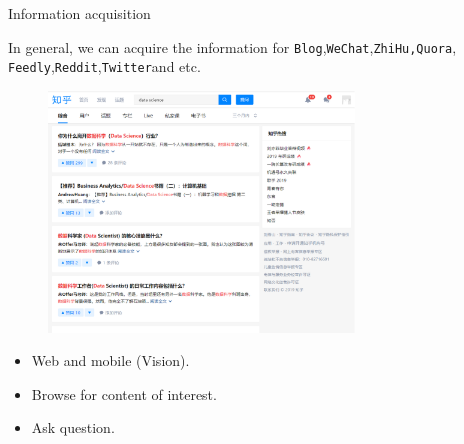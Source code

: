 \documentclass[
 size=14pt,
 paper=smartboard,  %
 mode=present, 		%
 display=slides, 	%
 style=tuliplab,  	%
 pauseslide,
 fleqn,leqno]{powerdot}{}
\begin{document}
\begin{slide}{Information acquisition}

In general, we can acquire the information for \texttt{Blog},\texttt{WeChat},\texttt{ZhiHu,Quora},
\texttt{Feedly},\texttt{Reddit},\texttt{Twitter}and etc.

\begin{figure}
  \centering
  \includegraphics[width=3.2in]{figures/zhihu.eps}\\
\end{figure}

\begin{itemize}
  \item Web and mobile (Vision).
  \item Browse for content of interest.
  \item Ask question.
\end{itemize}

\end{slide}
\end{document}
